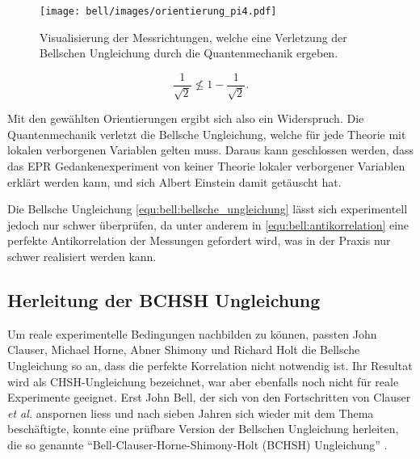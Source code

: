 \begin{refsection}
\begin{figure}
    \centering
    \texttt{[image: bell/images/orientierung\_pi4.pdf]}
    \caption{Visualisierung der Messrichtungen, welche eine Verletzung der
    Bellschen Ungleichung durch die Quantenmechanik ergeben.}
    \label{fig:bell:orientierung_pi4}
\end{figure}

\[
    \frac{1}{\sqrt{2}} \nleqslant 1 - \frac{1}{\sqrt{2}}.
\]

Mit den gew\"ahlten Orientierungen ergibt sich also ein Widerspruch. 
Die Quantenmechanik verletzt die Bellsche Ungleichung, welche f\"ur jede Theorie
mit lokalen verborgenen Variablen gelten muss.
Daraus kann geschlossen werden, dass das EPR Gedankenexperiment von keiner
Theorie lokaler verborgener Variablen erkl\"art werden kann, und sich Albert
Einstein damit get\"auscht hat.

Die Bellsche Ungleichung \eqref{equ:bell:bellsche_ungleichung} l\"asst sich
experimentell jedoch nur schwer \"uberpr\"ufen, da unter anderem in
\eqref{equ:bell:antikorrelation} eine perfekte Antikorrelation der Messungen
gefordert wird, was in der Praxis nur schwer realisiert werden kann.

\subsection{Herleitung der BCHSH Ungleichung}
Um reale experimentelle Bedingungen nachbilden zu k\"onnen, passten
John Clauser, Michael Horne, Abner Shimony und Richard Holt 
\cite{Bell:Clauser1969} die Bellsche Ungleichung so an, dass die perfekte
Korrelation nicht notwendig ist.
Ihr Resultat wird als CHSH-Ungleichung bezeichnet, war aber ebenfalls noch nicht
f\"ur reale Experimente geeignet.
Erst John Bell, der sich von den Fortschritten von Clauser \textit{et al.}
anspornen liess und nach sieben Jahren sich wieder mit dem Thema besch\"aftigte,
konnte eine pr\"ufbare Version der Bellschen Ungleichung herleiten, die so
genannte \enquote{Bell-Clauser-Horne-Shimony-Holt (BCHSH) Ungleichung}
\cite{Bell:Bell1971}. 


\end{refsection}
